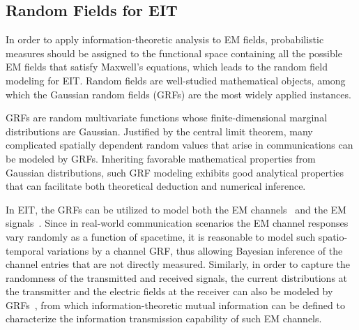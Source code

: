 \documentclass[journal,twocolumn]{IEEEtran}
\begin{document}
\subsection{Random Fields for EIT}
\label{Sec_2_Subsec_4}
In order to apply information-theoretic analysis to EM fields, probabilistic measures should be assigned to the functional space containing all the possible EM fields that satisfy Maxwell's equations, which leads to the random field modeling for EIT. 
Random fields are well-studied mathematical objects, among which the Gaussian random fields (GRFs) are the most widely applied instances. 

GRFs are random multivariate functions whose finite-dimensional marginal distributions are Gaussian. Justified by the central limit theorem, many complicated spatially dependent random values that arise in communications can be modeled by GRFs.  
Inheriting favorable mathematical properties from Gaussian distributions, such GRF modeling exhibits good analytical properties that can facilitate both theoretical deduction and numerical inference. 

In EIT, the GRFs can be utilized to model both the EM channels~\cite{marzetta2022fourier} and the EM signals~\cite{wan2022mutual}. Since in real-world communication scenarios the EM channel responses vary randomly as a function of spacetime, it is reasonable to model such spatio-temporal variations by a channel GRF, thus allowing Bayesian inference of the channel entries that are not directly measured. 
Similarly, in order to capture the randomness of the transmitted and received signals, the current distributions at the transmitter and the electric fields at the receiver can also be modeled by GRFs~\cite{wan2022mutual}, from which information-theoretic mutual information can be defined to characterize the information transmission capability of such EM channels. 


\end{document}
